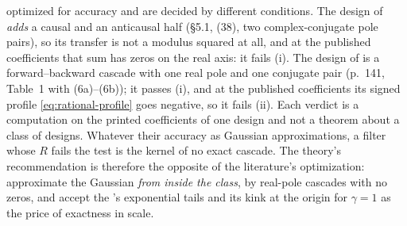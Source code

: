 \begin{remark}
optimized for accuracy and are decided by different conditions. The design of
 \emph{adds} a causal and an anticausal half (\S5.1, (38), two
complex-conjugate pole pairs), so its transfer is not a modulus squared at all, and at the
published coefficients that sum has zeros on the real axis: it fails (i). The design of
 is a forward--backward cascade with one real pole and one conjugate
pair (p.~141, Table~1 with (6a)--(6b)); it passes (i), and at the published coefficients its
signed profile \ref{eq:rational-profile} goes negative, so it fails (ii). Each verdict is a
computation on the printed coefficients of one design and not a theorem about a class of designs.
Whatever their accuracy as Gaussian approximations, a filter whose $R$ fails the test is
the kernel of no exact cascade. The theory's recommendation is therefore the opposite of the
literature's optimization: approximate the Gaussian \emph{from inside the class}, by real-pole
cascades with no zeros, and accept the \Matern{}'s exponential tails and its kink at the origin
for $\gamma = 1$ as the price of exactness in scale.
\end{remark}

